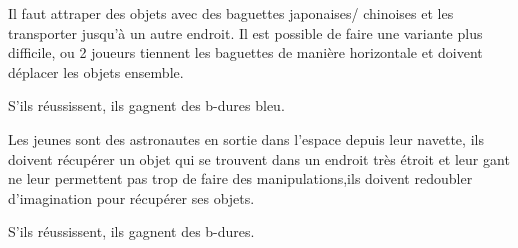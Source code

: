 \documentclass{grand-jeu}
\begin{document}
\begin{liste-materiel}
\end{liste-materiel}

\begin{regles}
Il faut attraper des objets avec des baguettes japonaises/ chinoises et les transporter jusqu’à un autre endroit. Il est possible de faire une variante plus difficile, ou 2 joueurs tiennent les baguettes de manière horizontale et doivent déplacer les objets ensemble.

S’ils réussissent, ils gagnent des b-dures bleu.
\end{regles}

\begin{imaginaire}
Les jeunes sont des astronautes en sortie dans l’espace depuis leur navette, ils doivent récupérer un objet qui se trouvent dans un endroit très étroit et leur gant ne leur permettent pas trop de faire des manipulations,ils doivent redoubler d'imagination pour récupérer ses objets.

S'ils réussissent, ils gagnent des b-dures.
\end{imaginaire}

\begin{moments-stop}
\end{moments-stop}
\end{document}
